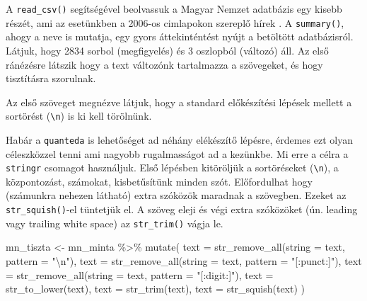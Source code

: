\documentclass[
]{book}
\newenvironment{Shaded}{\begin{snugshade}}{\end{snugshade}}
\newcommand{\AttributeTok}[1]{\textcolor[rgb]{0.77,0.63,0.00}{#1}}
\newcommand{\CommentTok}[1]{\textcolor[rgb]{0.56,0.35,0.01}{\textit{#1}}}
\newcommand{\DecValTok}[1]{\textcolor[rgb]{0.00,0.00,0.81}{#1}}
\newcommand{\FunctionTok}[1]{\textcolor[rgb]{0.00,0.00,0.00}{#1}}
\newcommand{\NormalTok}[1]{#1}
\newcommand{\OtherTok}[1]{\textcolor[rgb]{0.56,0.35,0.01}{#1}}
\newcommand{\SpecialCharTok}[1]{\textcolor[rgb]{0.00,0.00,0.00}{#1}}
\newcommand{\StringTok}[1]{\textcolor[rgb]{0.31,0.60,0.02}{#1}}
\begin{document}
A \texttt{read\_csv()} segítségével beolvassuk a Magyar Nemzet adatbázis
egy kisebb részét, ami az esetünkben a 2006-os cimlapokon szereplő hírek
. A \texttt{summary()}, ahogy a neve is mutatja, egy gyors
áttekinténtést nyújt a betöltött adatbázisról. Látjuk, hogy 2834 sorbol
(megfigyelés) és 3 oszlopból (változó) áll. Az első ránézésre látszik
hogy a text változónk tartalmazza a szövegeket, és hogy tisztításra
szorulnak.

Az első szöveget megnézve látjuk, hogy a standard előkészítési lépések
mellett a sortörést (\texttt{\textbackslash{}n}) is ki kell törölnünk.

\begin{Shaded}
\end{Shaded}

Habár a \texttt{quanteda} is lehetőséget ad néhány elékészítő lépésre,
érdemes ezt olyan céleszközzel tenni ami nagyobb rugalmasságot ad a
kezünkbe. Mi erre a célra a \texttt{stringr} csomagot használjuk. Első
lépésben kitöröljük a sortöréseket (\texttt{\textbackslash{}n}), a
központozást, számokat, kisbetűsítünk minden szót. Előfordulhat hogy
(számunkra nehezen látható) extra szóközök maradnak a szövegben. Ezeket
az \texttt{str\_squish()}-el tüntetjük el. A szöveg eleji és végi extra
szóközöket (ún. leading vagy trailing white space) az
\texttt{str\_trim()} vágja le.

\begin{Shaded}
\begin{Highlighting}[]
\NormalTok{mn\_tiszta }\OtherTok{\textless{}{-}}\NormalTok{ mn\_minta }\SpecialCharTok{\%\textgreater{}\%}
  \FunctionTok{mutate}\NormalTok{(}
    \AttributeTok{text =} \FunctionTok{str\_remove\_all}\NormalTok{(}\AttributeTok{string =}\NormalTok{ text, }\AttributeTok{pattern =} \StringTok{"}\SpecialCharTok{\textbackslash{}n}\StringTok{"}\NormalTok{),}
    \AttributeTok{text =} \FunctionTok{str\_remove\_all}\NormalTok{(}\AttributeTok{string =}\NormalTok{ text, }\AttributeTok{pattern =} \StringTok{"[:punct:]"}\NormalTok{),}
    \AttributeTok{text =} \FunctionTok{str\_remove\_all}\NormalTok{(}\AttributeTok{string =}\NormalTok{ text, }\AttributeTok{pattern =} \StringTok{"[:digit:]"}\NormalTok{),}
    \AttributeTok{text =} \FunctionTok{str\_to\_lower}\NormalTok{(text),}
    \AttributeTok{text =} \FunctionTok{str\_trim}\NormalTok{(text),}
    \AttributeTok{text =} \FunctionTok{str\_squish}\NormalTok{(text)}
\NormalTok{  )}
\end{Highlighting}
\end{Shaded}
\end{document}
